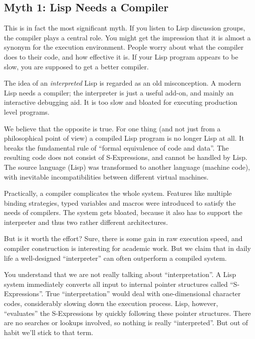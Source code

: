 \subsection{Myth 1: Lisp Needs a Compiler}
\label{sec:rad-myth-compiler}

This is in fact the most significant myth. If you listen to Lisp discussion
groups, the compiler plays a central role. You might get the impression that it
is almost a synonym for the execution environment. People worry about what the
compiler does to their code, and how effective it is. If your Lisp program
appears to be slow, you are supposed to get a better compiler.

The idea of an \emph{interpreted} Lisp is regarded as an old misconception. A
modern Lisp needs a compiler; the interpreter is just a useful add-on, and
mainly an interactive debugging aid. It is too slow and bloated for executing
production level programs.

We believe that the opposite is true. For one thing (and not just from a
philosophical point of view) a compiled Lisp program is no longer Lisp at all.
It breaks the fundamental rule of ``formal equivalence of code and data''. The
resulting code does not consist of S-Expressions, and cannot be handled by Lisp.
The source language (Lisp) was transformed to another language (machine code),
with inevitable incompatibilities between different virtual machines.

Practically, a compiler complicates the whole system. Features like multiple
binding strategies, typed variables and macros were introduced to satisfy the
needs of compilers. The system gets bloated, because it also has to support the
interpreter and thus two rather different architectures.

But is it worth the effort? Sure, there is some gain in raw execution speed, and
compiler construction is interesting for academic work. But we claim that in
daily life a well-designed ``interpreter'' can often outperform a compiled
system.

You understand that we are not really talking about ``interpretation''. A Lisp
system immediately converts all input to internal pointer structures called
``S-Expressions''. True ``interpretation'' would deal with one-dimensional
character codes, considerably slowing down the execution process. Lisp, however,
``evaluates'' the S-Expressions by quickly following these pointer structures.
There are no searches or lookups involved, so nothing is really ``interpreted''.
But out of habit we'll stick to that term.

